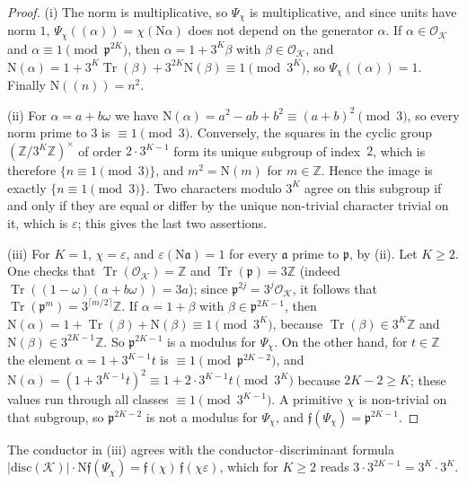 \documentclass[12pt]{amsart}
\theoremstyle{plain}
\theoremstyle{definition}
\theoremstyle{remark}
\newcommand{\Z}{\mathbb{Z}}
\newcommand{\K}{\mathcal{K}}          %
\newcommand{\OK}{\mathcal{O}_{\K}}
\newcommand{\Nf}{\mathrm{N}}          %
\newcommand{\disc}{\mathrm{disc}}
\newcommand{\cond}{\mathfrak{f}}      %
\newcommand{\pp}{\mathfrak{p}}        %
\begin{document}
\begin{proof}
(i) The norm is multiplicative, so $\Psi_\chi$ is multiplicative, and since
units have norm $1$, $\Psi_\chi((\alpha)) = \chi(\Nf\alpha)$ does not depend
on the generator $\alpha$. If $\alpha \in \OK$ and $\alpha \equiv 1
\pmod{\pp^{2K}}$, then $\alpha = 1 + 3^K\beta$ with $\beta \in \OK$, and
$\Nf(\alpha) = 1 + 3^K\operatorname{Tr}(\beta) + 3^{2K}\Nf(\beta) \equiv 1
\pmod{3^K}$, so $\Psi_\chi((\alpha)) = 1$. Finally $\Nf((n)) = n^2$.

(ii) For $\alpha = a + b\omega$ we have $\Nf(\alpha) = a^2 - ab + b^2 \equiv
(a+b)^2 \pmod 3$, so every norm prime to $3$ is $\equiv 1 \pmod 3$.
Conversely, the squares in the cyclic group $(\Z/3^K\Z)^\times$ of order
$2\cdot 3^{K-1}$ form its unique subgroup of index~$2$, which is therefore
$\{n \equiv 1 \pmod 3\}$, and $m^2 = \Nf(m)$ for $m \in \Z$. Hence the image
is exactly $\{n \equiv 1 \pmod 3\}$. Two characters modulo $3^K$ agree on
this subgroup if and only if they are equal or differ by the unique
non-trivial character trivial on it, which is $\varepsilon$; this gives the
last two assertions.

(iii) For $K = 1$, $\chi = \varepsilon$, and $\varepsilon(\Nf\mathfrak a) =
1$ for every $\mathfrak a$ prime to $\pp$, by (ii). Let $K \geq 2$. One
checks that $\operatorname{Tr}(\OK) = \Z$ and $\operatorname{Tr}(\pp) =
3\Z$ (indeed $\operatorname{Tr}((1-\omega)(a+b\omega)) = 3a$); since
$\pp^{2j} = 3^j\OK$, it follows that $\operatorname{Tr}(\pp^m) =
3^{\lceil m/2\rceil}\Z$. If $\alpha = 1 + \beta$ with $\beta \in
\pp^{2K-1}$, then $\Nf(\alpha) = 1 + \operatorname{Tr}(\beta) + \Nf(\beta)
\equiv 1 \pmod{3^K}$, because $\operatorname{Tr}(\beta) \in 3^K\Z$ and
$\Nf(\beta) \in 3^{2K-1}\Z$. So $\pp^{2K-1}$ is a modulus for $\Psi_\chi$.
On the other hand, for $t \in \Z$ the element $\alpha = 1 + 3^{K-1}t$ is
$\equiv 1 \pmod{\pp^{2K-2}}$, and $\Nf(\alpha) = (1+3^{K-1}t)^2 \equiv
1 + 2\cdot3^{K-1}t \pmod{3^K}$ because $2K - 2 \geq K$; these values run
through all classes $\equiv 1 \pmod{3^{K-1}}$. A primitive $\chi$ is
non-trivial on that subgroup, so $\pp^{2K-2}$ is not a modulus for
$\Psi_\chi$, and $\cond(\Psi_\chi) = \pp^{2K-1}$.
\end{proof}

The conductor in (iii) agrees with the conductor--discriminant formula
$|\disc(\K)|\cdot\Nf\cond(\Psi_\chi) = \cond(\chi)\,\cond(\chi\varepsilon)$,
which for $K \geq 2$ reads $3 \cdot 3^{2K-1} = 3^K\cdot 3^K$.
\end{document}
